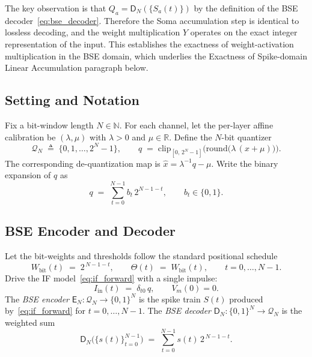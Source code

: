 \documentclass{article}
\theoremstyle{plain}
\theoremstyle{definition}
\theoremstyle{remark}
\begin{document}
The key observation is that $Q_a = \mathsf{D}_N(\{S_a(t)\})$ by the definition of
the BSE decoder~\eqref{eq:bse_decoder}. Therefore the Soma accumulation step is
identical to lossless decoding, and the weight multiplication $Y$ operates on the
exact integer representation of the input. This establishes the exactness of
weight-activation multiplication in the BSE domain, which underlies the
Exactness of Spike-domain Linear Accumulation paragraph below.

\subsection{Setting and Notation}
\label{app:bse_setting}

Fix a bit-window length $N \in \mathbb{N}$. For each channel, let the per-layer
affine calibration be $(\lambda, \mu)$ with $\lambda > 0$ and $\mu \in \mathbb{R}$.
Define the $N$-bit quantizer
\begin{equation}
\label{eq:quantizer_grid_def}
\mathcal{Q}_N \;\triangleq\; \{0, 1, \dots, 2^N - 1\},
\qquad
q \;=\; \mathrm{clip}_{[0,\,2^N-1]}\!\Big(\mathrm{round}\big(\lambda\,(x+\mu)\big)\Big).
\end{equation}
The corresponding de-quantization map is $\hat{x} = \lambda^{-1}q - \mu$. Write the
binary expansion of $q$ as
\begin{equation}
\label{eq:binary_expansion_def}
q \;=\; \sum_{t=0}^{N-1} b_t\,2^{N-1-t}, \qquad b_t \in \{0,1\}.
\end{equation}

\subsection{BSE Encoder and Decoder}
\label{app:bse_encdec}

Let the bit-weights and thresholds follow the standard positional schedule
\begin{equation}
\label{eq:standard_bit_schedule}
W_{\mathrm{bit}}(t) \;=\; 2^{\,N-1-t},
\qquad
\Theta(t) \;=\; W_{\mathrm{bit}}(t),
\qquad t = 0, \dots, N-1.
\end{equation}
Drive the IF model~\eqref{eq:if_forward} with a single impulse:
\begin{equation}
\label{eq:scalar_drive}
I_{\mathrm{in}}(t) \;=\; \delta_{t0}\,q, \qquad V_m(0) = 0.
\end{equation}
The \emph{BSE encoder} $\mathsf{E}_N : \mathcal{Q}_N \to \{0,1\}^N$ is the spike
train $S(t)$ produced by~\eqref{eq:if_forward} for $t = 0, \dots, N-1$. The
\emph{BSE decoder} $\mathsf{D}_N : \{0,1\}^N \to \mathcal{Q}_N$ is the weighted sum
\begin{equation}
\label{eq:bse_decoder}
\mathsf{D}_N\!\big(\{s(t)\}_{t=0}^{N-1}\big)
\;=\; \sum_{t=0}^{N-1} s(t)\,2^{\,N-1-t}.
\end{equation}
\end{document}
